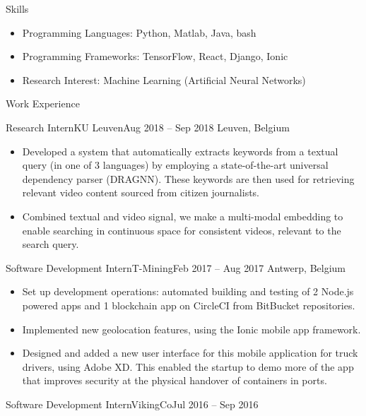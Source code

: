 \documentclass[]{mcdowellcv}
\begin{document}
\makeheader
      
\begin{cvsection}{Skills}
	\begin{cvsubsection}{}{}{}
		\begin{itemize}
			\item Programming Languages:  Python, Matlab, Java, bash
			\item Programming Frameworks:  TensorFlow, React, Django, Ionic
			\item Research Interest: Machine Learning (Artificial Neural Networks)
		\end{itemize}
	\end{cvsubsection}
\end{cvsection}
\begin{cvsection}{Work Experience}
	\begin{cvsubsection}{Research Intern}{KU Leuven}{Aug 2018 -- Sep 2018}
		Leuven, Belgium
		\begin{itemize}%
			\item Developed a system that automatically extracts keywords from a textual query (in one of 3 languages) by employing a state-of-the-art universal dependency parser (DRAGNN). These keywords are then used for retrieving relevant video content sourced from citizen journalists.
			\item Combined textual and video signal, we make a multi-modal embedding to enable searching in continuous space for consistent videos, relevant to the search query.
		\end{itemize}
	\end{cvsubsection}
	\begin{cvsubsection}{Software Development Intern}{T-Mining}{Feb 2017 -- Aug 2017}
		Antwerp, Belgium
		\begin{itemize}%
			\item Set up development operations: automated building and testing of 2 Node.js powered apps and 1 blockchain app on CircleCI from BitBucket repositories.
			\item Implemented new geolocation features, using the Ionic mobile app framework. 
			\item Designed and added a new user interface for this mobile application for truck drivers, using Adobe XD. This enabled the startup to demo more of the app that improves security at the physical handover of containers in ports.
		\end{itemize}
	\end{cvsubsection}
	\begin{cvsubsection}{Software Development Intern}{VikingCo}{Jul 2016 -- Sep 2016}

\end{cvsubsection}
\end{cvsection}
\end{document}
